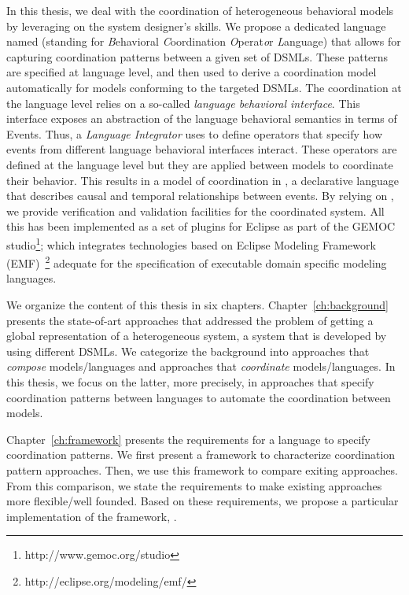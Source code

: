In this thesis, we deal with the coordination of heterogeneous behavioral models by leveraging on the system designer's skills. We propose a dedicated language named \bcool (standing for \emph{B}ehavioral \emph{C}oordination \emph{O}perat\emph{o}r \emph{L}anguage) that allows for capturing coordination patterns between a given set of DSMLs. These patterns are specified at language level, and then used to derive a coordination model automatically for models conforming to the targeted DSMLs. The coordination at the language level relies on a so-called \emph{language behavioral interface}. This interface exposes an abstraction of the language behavioral semantics in terms of Events. Thus, a \emph{Language Integrator} uses \bcool to define operators that specify how events from different language behavioral interfaces interact. These operators are defined at the language level but they are applied between models to coordinate their behavior. This results in a model of coordination in \ccsl, a declarative language that describes causal and temporal relationships between events. By relying on \ccsl, we provide verification and validation facilities for the coordinated system. All this has been implemented as a set of plugins for Eclipse as part of the GEMOC studio\footnote{http://www.gemoc.org/studio}; which integrates technologies based on Eclipse Modeling Framework (EMF)~\footnote{http://eclipse.org/modeling/emf/} adequate for the specification of executable domain specific modeling languages. %

We organize the content of this thesis in six chapters. Chapter~\ref{ch:background} presents the state-of-art approaches that addressed the problem of getting a global representation of a heterogeneous system, \ie a system that is developed by using different DSMLs. We categorize the background into approaches that \emph{compose} models/languages and approaches that \emph{coordinate} models/languages. In this thesis, we focus on the latter, more precisely, in approaches that specify coordination patterns between languages to automate the coordination between models.  

Chapter~\ref{ch:framework} presents the requirements for a language to specify coordination patterns. We first present a framework to characterize coordination pattern approaches. Then, we use this framework to compare exiting approaches. From this comparison, we state the requirements to make existing approaches more flexible/well founded. Based on these requirements, we propose a particular implementation of the framework, \ie \bcool. 

